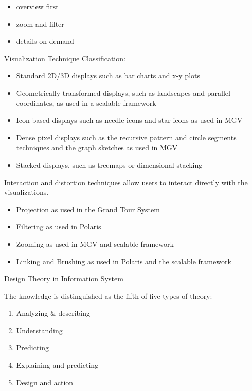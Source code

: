 \documentclass[print]{nuthesis}
\providecommand{\tightlist}{%
  \setlength{\itemsep}{0pt}\setlength{\parskip}{0pt}}
\begin{document}
\begin{itemize}
\tightlist
\item
  overview first
\item
  zoom and filter
\item
  details-on-demand
\end{itemize}


Visualization Technique Classification:

\begin{itemize}
\tightlist
\item
  Standard 2D/3D displays such as bar charts and x-y plots
\item
  Geometrically transformed displays, such as landscapes and parallel coordinates, as used in a scalable framework
\item
  Icon-based displays such as needle icons and star icons as used in MGV
\item
  Dense pixel displays such as the recursive pattern and circle segments techniques and the graph sketches as used in MGV
\item
  Stacked displays, such as treemaps or dimensional stacking
\end{itemize}

Interaction and distortion techniques allow users to interact directly with the visualizations.

\begin{itemize}
\tightlist
\item
  Projection as used in the Grand Tour System
\item
  Filtering as used in Polaris
\item
  Zooming as used in MGV and scalable framework
\item
  Linking and Brushing as used in Polaris and the scalable framework
\end{itemize}

Design Theory in Information System

The knowledge is distinguished as the fifth of five types of theory:

\begin{enumerate}
\def\labelenumi{\arabic{enumi}.}
\tightlist
\item
  Analyzing \& describing
\item
  Understanding
\item
  Predicting
\item
  Explaining and predicting
\item
  Design and action
\end{enumerate}
\end{document}

